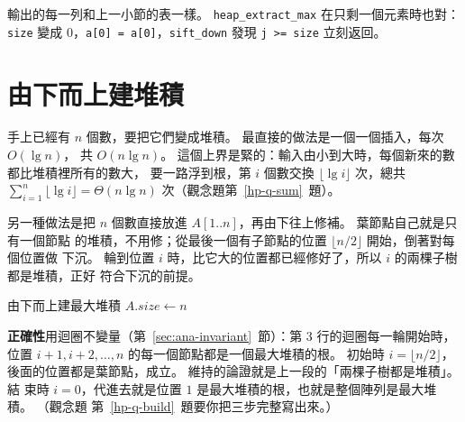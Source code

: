 
輸出的每一列和上一小節的表一樣。 \texttt{heap\_extract\_max} 在只剩一個元素時也對：
\texttt{size} 變成 $0$，\texttt{a[0] = a[0]}，\texttt{sift\_down} 發現 \texttt{j >= size}
立刻返回。

\section{由下而上建堆積}
\label{sec:hp-build}

手上已經有 $n$ 個數，要把它們變成堆積。 最直接的做法是一個一個插入，每次 $O(\lg n)$，
共 $O(n \lg n)$。 這個上界是緊的：輸入由小到大時，每個新來的數都比堆積裡所有的數大，
要一路浮到根，第 $i$ 個數交換 $\lfloor \lg i \rfloor$ 次，總共
$\sum_{i=1}^{n} \lfloor \lg i \rfloor = \Theta(n \lg n)$ 次（觀念題第~\ref{hp-q-sum}~題）。

另一種做法是把 $n$ 個數直接放進 $A[1..n]$，再由下往上修補。 葉節點自己就是只有一個節點
的堆積，不用修；從最後一個有子節點的位置 $\lfloor n/2 \rfloor$ 開始，倒著對每個位置做
下沉。 輪到位置 $i$ 時，比它大的位置都已經修好了，所以 $i$ 的兩棵子樹都是堆積，正好
符合下沉的前提。

\begin{pseudo}[label=alg:hp-build]{由下而上建最大堆積}
    \State $A.\mathit{size} \gets n$
        \State {}
    \EndFor
\EndProcedure
\end{pseudo}

\textbf{正確性}用迴圈不變量（第~\ref{sec:ana-invariant}~節）：第 3 行的迴圈每一輪開始時，位置
$i + 1, i + 2, \ldots, n$ 的每一個節點都是一個最大堆積的根。 初始時 $i = \lfloor n/2
\rfloor$，後面的位置都是葉節點，成立。 維持的論證就是上一段的「兩棵子樹都是堆積」。 結
束時 $i = 0$，代進去就是位置 $1$ 是最大堆積的根，也就是整個陣列是最大堆積。 （觀念題
第~\ref{hp-q-build}~題要你把三步完整寫出來。）

